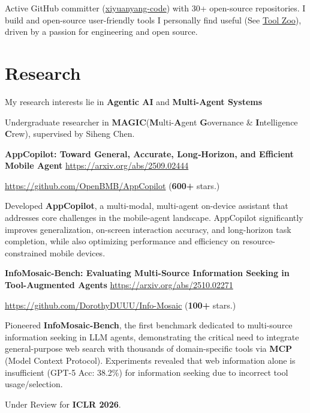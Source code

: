 \documentclass[letterpaper,11pt]{article}
\begin{document}
Active GitHub committer (\href{https://github.com/xiyuanyang-code}{xiyuanyang-code}) with 30+ open-source repositories. I build and open-source user-friendly tools I personally find useful (See \href{https://xiyuanyang-code.github.io/Tool-Zoo/}{Tool Zoo}), driven by a passion for engineering and open source.


\newpage

\section{Research}


My research interests lie in \textbf{Agentic AI} and  \textbf{Multi-Agent Systems}

Undergraduate researcher in \textbf{MAGIC}(\textbf{M}ulti-\textbf{A}gent \textbf{G}overnance \& \textbf{I}ntelligence \textbf{C}rew), supervised by Siheng Chen.
\newline

\textbf{AppCopilot: Toward General, Accurate, Long‑Horizon, and Efficient Mobile Agent}
\url{https://arxiv.org/abs/2509.02444}

\url{https://github.com/OpenBMB/AppCopilot} (\textbf{600+} stars.)

Developed \textbf{AppCopilot}, a multi-modal, multi-agent on-device assistant that addresses core challenges in the mobile-agent landscape. AppCopilot significantly improves generalization, on-screen interaction accuracy, and long-horizon task completion, while also optimizing performance and efficiency on resource-constrained mobile devices.
\newline


\textbf{InfoMosaic-Bench: Evaluating Multi-Source Information Seeking in Tool-Augmented Agents}
\url{https://arxiv.org/abs/2510.02271}

\url{https://github.com/DorothyDUUU/Info-Mosaic} (\textbf{100+} stars.)

Pioneered \textbf{InfoMosaic-Bench}, the first benchmark dedicated to multi-source information seeking in LLM agents, demonstrating the critical need to integrate general-purpose web search with thousands of domain-specific tools via \textbf{MCP} (Model Context Protocol). Experiments revealed that web information alone is insufficient (GPT-5 Acc: 38.2\%) for information seeking due to incorrect tool usage/selection.

Under Review for \textbf{ICLR 2026}.
\end{document}
